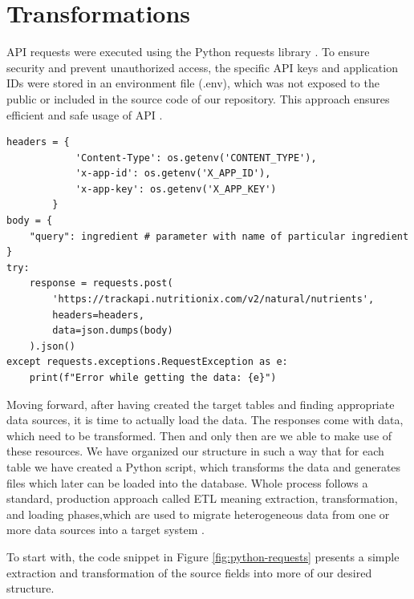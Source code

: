 \section{Transformations}
\par
API requests were executed using the Python requests library \cite{Requests}. To ensure security and prevent unauthorized access, the specific API keys and application IDs were stored in an environment file (.env), which was not exposed to the public or included in the source code of our repository. This approach ensures efficient and safe usage of API \cite{nutritionix}. 
{
\begin{verbatim}
headers = {
            'Content-Type': os.getenv('CONTENT_TYPE'),
            'x-app-id': os.getenv('X_APP_ID'),
            'x-app-key': os.getenv('X_APP_KEY')
        }
body = {
    "query": ingredient # parameter with name of particular ingredient  
}
try:
    response = requests.post(
        'https://trackapi.nutritionix.com/v2/natural/nutrients',
        headers=headers,
        data=json.dumps(body)
    ).json()
except requests.exceptions.RequestException as e:
    print(f"Error while getting the data: {e}") 
\end{verbatim}
\label{fig:python-requests}
}

Moving forward, after having created the target tables and finding appropriate data sources, it is time to actually load the data. The responses come with data, which need to be transformed. Then and only then are we able to make use of these resources. We have organized our structure in such a way that for each table we have created a Python script, which transforms the data and generates files which later can be loaded into the database. Whole process follows a standard, production approach called ETL meaning extraction, transformation, and loading phases,which are used to migrate heterogeneous data from one or more data sources into a target system \cite{ETL-process}.
\par
To start with, the code snippet in Figure \ref{fig:python-requests} presents a simple extraction and transformation of the source fields into more of our desired structure.

\clearpage %

